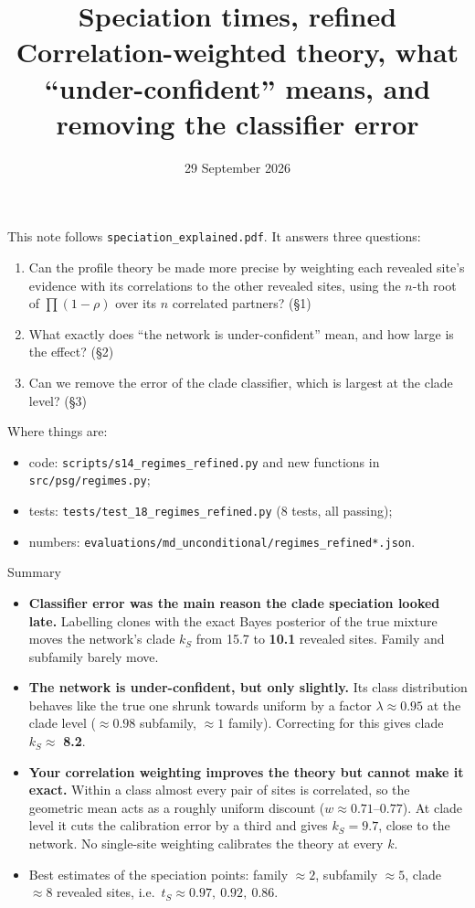\documentclass[11pt,a4paper]{article}
\title{\textbf{Speciation times, refined}\\[3pt]
\large Correlation-weighted theory, what ``under-confident'' means, and removing the classifier error}
\date{29 September 2026}
\begin{document}
\maketitle

\noindent This note follows \texttt{speciation\_explained.pdf}. It answers three questions:
\begin{enumerate}[nosep]
\item Can the profile theory be made more precise by weighting each revealed site's evidence with its correlations to
the other revealed sites, using the $n$-th root of $\prod(1-\rho)$ over its $n$ correlated partners? (\S1)
\item What exactly does ``the network is under-confident'' mean, and how large is the effect? (\S2)
\item Can we remove the error of the clade classifier, which is largest at the clade level? (\S3)
\end{enumerate}
Where things are:
\begin{itemize}[nosep]
\item code: \texttt{scripts/s14\_regimes\_refined.py} and new functions in \texttt{src/psg/regimes.py};
\item tests: \texttt{tests/test\_18\_regimes\_refined.py} (8 tests, all passing);
\item numbers: \texttt{evaluations/md\_unconditional/regimes\_refined*.json}.
\end{itemize}

\begin{keybox}{Summary}
\begin{itemize}[nosep,leftmargin=*]
\item \textbf{Classifier error was the main reason the clade speciation looked late.} Labelling clones with the exact
Bayes posterior of the true mixture moves the network's clade $k_S$ from 15.7 to \textbf{10.1} revealed sites. Family and
subfamily barely move.
\item \textbf{The network is under-confident, but only slightly.} Its class distribution behaves like the true one
shrunk towards uniform by a factor $\lambda\approx0.95$ at the clade level ($\approx0.98$ subfamily, $\approx1$
family). Correcting for this gives clade $k_S\approx$ \textbf{8.2}.
\item \textbf{Your correlation weighting improves the theory but cannot make it exact.} Within a class almost every pair
of sites is correlated, so the geometric mean acts as a roughly uniform discount ($w\approx0.71$--$0.77$). At clade
level it cuts the calibration error by a third and gives $k_S=9.7$, close to the network. No single-site weighting
calibrates the theory at every $k$.
\item Best estimates of the speciation points: family $\approx2$, subfamily $\approx5$, clade $\approx8$ revealed
sites, i.e.\ $t_S\approx0.97,\ 0.92,\ 0.86$.
\end{itemize}
\end{keybox}
\end{document}
